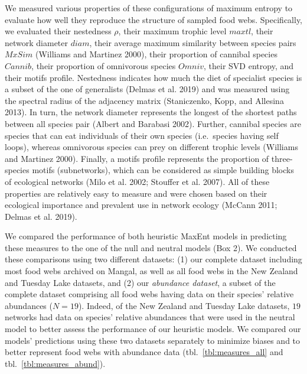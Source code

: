 \documentclass[10pt,oneside]{article}
\begin{document}
We measured various properties of these configurations of maximum
entropy to evaluate how well they reproduce the structure of sampled
food webs. Specifically, we evaluated their nestedness \(\rho\), their
maximum trophic level \(maxtl\), their network diameter \(diam\), their
average maximum similarity between species pairs \(MxSim\) (Williams and
Martinez 2000), their proportion of cannibal species \(Cannib\), their
proportion of omnivorous species \(Omniv\), their SVD entropy, and their
motifs profile. Nestedness indicates how much the diet of specialist
species is a subset of the one of generalists (Delmas et al. 2019) and
was measured using the spectral radius of the adjacency matrix
(Staniczenko, Kopp, and Allesina 2013). In turn, the network diameter
represents the longest of the shortest paths between all species pair
(Albert and Barabasi 2002). Further, cannibal species are species that
can eat individuals of their own species (i.e.~species having self
loops), whereas omnivorous species can prey on different trophic levels
(Williams and Martinez 2000). Finally, a motifs profile represents the
proportion of three-species motifs (subnetworks), which can be
considered as simple building blocks of ecological networks (Milo et al.
2002; Stouffer et al. 2007). All of these properties are relatively easy
to measure and were chosen based on their ecological importance and
prevalent use in network ecology (McCann 2011; Delmas et al. 2019).

We compared the performance of both heuristic MaxEnt models in
predicting these measures to the one of the null and neutral models (Box
2). We conducted these comparisons using two different datasets: (1) our
complete dataset including most food webs archived on Mangal, as well as
all food webs in the New Zealand and Tuesday Lake datasets, and (2) our
\emph{abundance dataset}, a subset of the complete dataset comprising
all food webs having data on their species' relative abundances
(\(N=19\)). Indeed, of the New Zealand and Tuesday Lake datasets, \(19\)
networks had data on species' relative abundances that were used in the
neutral model to better assess the performance of our heuristic models.
We compared our models' predictions using these two datasets separately
to minimize biases and to better represent food webs with abundance data
(tbl.~\ref{tbl:measures_all} and tbl.~\ref{tbl:measures_abund}).
\end{document}
